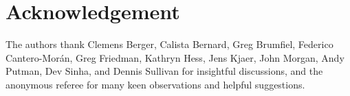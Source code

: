 \section*{Acknowledgement}

The authors thank Clemens Berger, Calista Bernard, Greg Brumfiel, Federico Cantero-Mor\'an, Greg Friedman, Kathryn Hess, Jens Kjaer, John Morgan, Andy Putman, Dev Sinha, and Dennis Sullivan for insightful discussions, and the anonymous referee for many keen observations and helpful suggestions.